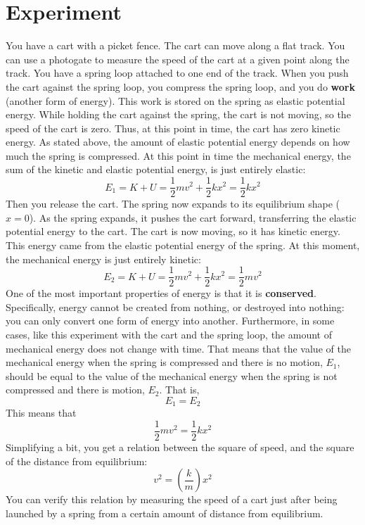\section{Experiment}
%
You have a cart with a picket fence. The cart can move along a flat track. You can use a photogate to measure the speed of the cart at a given point along the track. You have a spring loop attached to one end of the track. When you push the cart against the spring loop, you compress the spring loop, and you do \textbf{work} (another form of energy). This work is stored on the spring as elastic potential energy. While holding the cart against the spring, the cart is not moving, so the speed of the cart is zero. Thus, at this point in time, the cart has zero kinetic energy. As stated above, the amount of elastic potential energy depends on how much the spring is compressed. At this point in time the mechanical energy, the sum of the kinetic and elastic potential energy, is just entirely elastic:
\begin{equation}
    E_{1} = K + U = \frac{1}{2} m v^{2} + \frac{1}{2} k x^{2} = \frac{1}{2} k x^{2}
\end{equation}
Then you release the cart. The spring now expands to its equilibrium shape ($x = 0$). As the spring expands, it pushes the cart forward, transferring the elastic potential energy to the cart. The cart is now moving, so it has kinetic energy. This energy came from the elastic potential energy of the spring. At this moment, the mechanical energy is just entirely kinetic:
\begin{equation}
    E_{2} = K + U = \frac{1}{2} m v^{2} + \frac{1}{2} k x^{2} = \frac{1}{2} m v^{2}
\end{equation}
One of the most important properties of energy is that it is \textbf{conserved}. Specifically, energy cannot be created from nothing, or destroyed into nothing: you can only convert one form of energy into another. Furthermore, in some cases, like this experiment with the cart and the spring loop, the amount of mechanical energy does not change with time. That means that the value of the mechanical energy when the spring is compressed and there is no motion, $E_{1}$, should be equal to the value of the mechanical energy when the spring is not compressed and there is motion, $E_{2}$. That is,
\begin{equation}
    E_{1} = E_{2}
\end{equation}
This means that
\begin{equation}
    \frac{1}{2} m v^{2} = \frac{1}{2} k x^{2}
\end{equation}
Simplifying a bit, you get a relation between the square of speed, and the square of the distance from equilibrium:
\begin{equation}
    v^{2} = \left( \frac{k}{m} \right) x^{2}
\end{equation}
You can verify this relation by measuring the speed of a cart just after being launched by a spring from a certain amount of distance from equilibrium.

